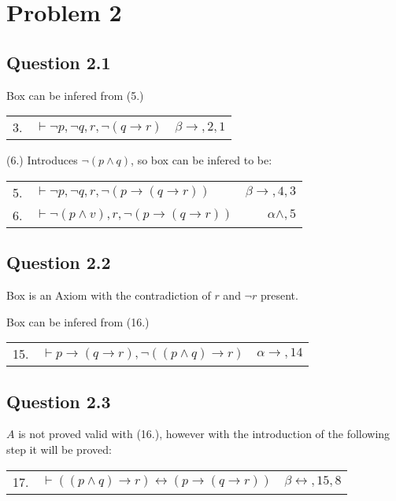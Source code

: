 \newpage
\section*{Problem 2}

\subsection*{Question 2.1}
Box  can be infered from (5.)

\begin{tabular}{ clr }
    3. & $\vdash \neg p, \neg q, r, \neg (q \to r)$ & $\beta \to, 2,1$
\end{tabular}


(6.) Introduces $\neg (p \land q)$, so box  can be infered to be:

\begin{tabular}{ clr }
    5. & $\vdash \neg p, \neg q, r, \neg (p \to (q \to r))$ & $\beta\to,4,3$ \\
    6. & $\vdash \neg (p \land v), r, \neg (p \to (q \to r))$ & $\alpha\land, 5$\\
\end{tabular}

\subsection*{Question 2.2}
Box  is an Axiom with the contradiction of $r$ and $\neg r$ present.

Box  can be infered from (16.)

\begin{tabular}{ clr }
    15. & $\vdash p \to (q \to r), \neg ((p \land q) \to r)$ & $\alpha\to,14$ \\
\end{tabular}


\subsection*{Question 2.3}
$A$ is not proved valid with (16.), however with the introduction of the following step it will be proved:\\
\begin{tabular}{ clr }
    17. & $\vdash ((p  \land q) \to r) \leftrightarrow (p \to (q  \to r))$ & $\beta\leftrightarrow,15,8$ \\
\end{tabular}